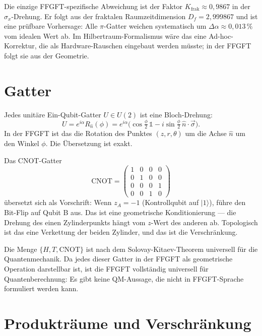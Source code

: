 Die einzige FFGFT-spezifische Abweichung ist der Faktor
$K_{\mathrm{frak}}\approx0{,}9867$ in der $\sigma_x$-Drehung. Er folgt aus
der fraktalen Raumzeitdimension $D_f = 2{,}999867$ und ist eine prüfbare
Vorhersage: Alle $\pi$-Gatter weichen systematisch um
$\Delta\alpha\approx0{,}013\,\%$ vom idealen Wert ab. Im
Hilbertraum-Formalismus wäre das eine Ad-hoc-Korrektur, die als
Hardware-Rauschen eingebaut werden müsste; in der FFGFT folgt sie aus
der Geometrie.

\section{Gatter}

Jedes unitäre Ein-Qubit-Gatter $U\in U(2)$ ist eine Bloch-Drehung:
\begin{equation}
  U = e^{i\alpha}R_{\hat n}(\phi)
    = e^{i\alpha}\bigl(\cos\tfrac{\phi}{2}\,\mathbb{1}
      - i\sin\tfrac{\phi}{2}\,\hat n\cdot\vec\sigma\bigr).
\end{equation}
In der FFGFT ist das die Rotation des Punktes $(z,r,\theta)$ um die Achse
$\hat n$ um den Winkel $\phi$. Die Übersetzung ist exakt.

Das CNOT-Gatter
\begin{equation}
  \mathrm{CNOT} =
  \begin{pmatrix}1&0&0&0\\0&1&0&0\\0&0&0&1\\0&0&1&0\end{pmatrix}
\end{equation}
übersetzt sich als Vorschrift: Wenn $z_A = -1$ (Kontrollqubit auf
$|1\rangle$), führe den Bit-Flip auf Qubit B aus. Das ist eine geometrische
Konditionierung --- die Drehung des einen Zylinderpunkts hängt vom
$z$-Wert des anderen ab. Topologisch ist das eine Verkettung der beiden
Zylinder, und das ist die Verschränkung.

Die Menge $\{H,T,\mathrm{CNOT}\}$ ist nach dem Solovay-Kitaev-Theorem
universell für die Quantenmechanik. Da jedes dieser Gatter in der
FFGFT als geometrische Operation darstellbar ist, ist die FFGFT
vollständig universell für Quantenberechnung: Es gibt keine QM-Aussage,
die nicht in FFGFT-Sprache formuliert werden kann.

\section{Produkträume und Verschränkung}

